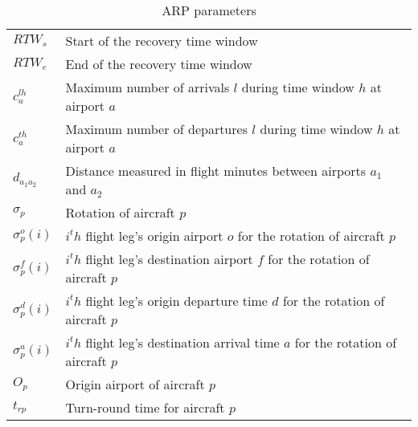 \begin{table}[h!]
	\centering
	\caption{ARP parameters}
	\label{tbl:parameters}
		\begin{tabular}{ll}
		\hline
		$RTW_s$   & Start of the recovery time window   \\ 
		$RTW_e$   & End of the recovery time window     \\ 
		$c^{lh}_a$ & Maximum number of arrivals $l$ during time window $h$ at airport $a$ \\
		$c^{th}_a$ & Maximum number of departures $l$ during time window $h$ at airport $a$ \\
		$d_{a_{1} a_{2}}$ & Distance measured  in flight minutes between airports $a_{1}$ and $a_{2}$ \\
		$\sigma_p $ & Rotation of aircraft $p$ \\
		$\sigma^o_p(i)$ & $i^th$  flight leg's origin airport $o$ for the rotation of aircraft $p$ \\
		$\sigma^f_p(i)$ & $i^th$  flight leg's destination airport $f$ for the rotation of aircraft $p$ \\
		$\sigma^d_p(i)$ & $i^th$  flight leg's origin departure time $d$ for the rotation of aircraft $p$ \\
		$\sigma^a_p(i)$ & $i^th$  flight leg's destination arrival time $a$ for the rotation of aircraft $p$ \\
		$O_p$ & Origin airport of aircraft $p$ \\
		$t_{rp}$ & Turn-round time for aircraft $p$ \\
		\hline		
	\end{tabular}
\end{table}


